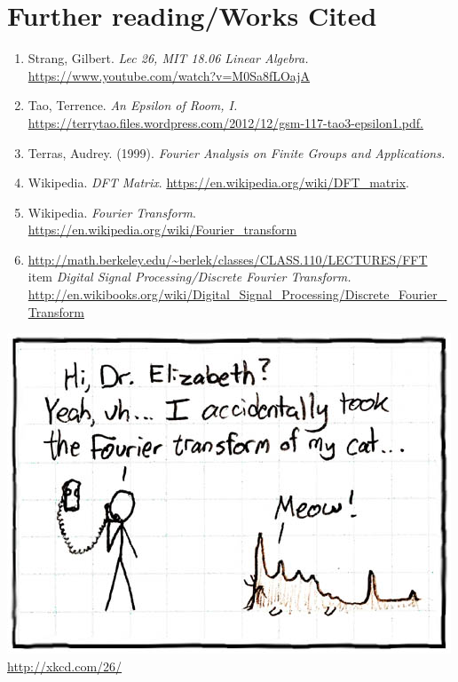 \documentclass[11pt]{article}
\begin{document}
\section{Further reading/Works Cited}
\begin{enumerate}
\item Strang, Gilbert. \emph{Lec 26, MIT 18.06 Linear Algebra.} \url{https://www.youtube.com/watch?v=M0Sa8fLOajA}
\item Tao, Terrence. \emph{An Epsilon of Room, I.} \url{https://terrytao.files.wordpress.com/2012/12/gsm-117-tao3-epsilon1.pdf.}
\item Terras, Audrey. (1999). \emph{Fourier Analysis on Finite Groups and Applications.}
\item Wikipedia. \emph{DFT Matrix}. \url{https://en.wikipedia.org/wiki/DFT_matrix}.
\item Wikipedia. \emph{Fourier Transform}. \url{https://en.wikipedia.org/wiki/Fourier_transform}
\item \url{http://math.berkeley.edu/~berlek/classes/CLASS.110/LECTURES/FFT}
item \emph{Digital Signal Processing/Discrete Fourier Transform. } \url{http://en.wikibooks.org/wiki/Digital_Signal_Processing/Discrete_Fourier_Transform}
\end{enumerate}
\vfill
  \centering
 \includegraphics[scale=3]{fourier.jpg}\\
 \url{http://xkcd.com/26/}
\end{document}
